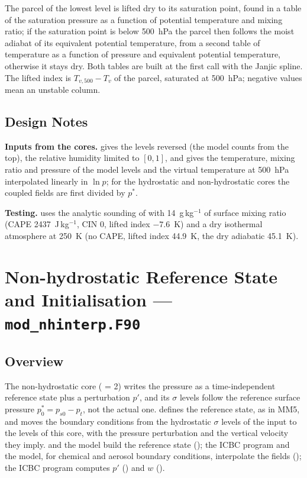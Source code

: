 The parcel of the lowest level is lifted dry to its saturation point, found
in a table of the saturation pressure as a function of potential
temperature and mixing ratio; if the saturation point is below 500~hPa the
parcel then follows the moist adiabat of its equivalent potential
temperature, from a second table of temperature as a function of pressure
and equivalent potential temperature, otherwise it stays dry. Both tables
are built at the first call with the Janjic spline. The lifted index is
$T_{v,500} - T_v$ of the parcel, saturated at 500~hPa; negative values mean
an unstable column.

\subsection{Design Notes}

\textbf{Inputs from the cores.}  gives
 the levels reversed (the model counts from the top), the
relative humidity limited to $[0,1]$, and gives  the
temperature, mixing ratio and pressure of the model levels and the virtual
temperature at 500~hPa interpolated linearly in $\ln p$; for the
hydrostatic and non-hydrostatic cores the coupled fields are first divided
by $p^*$.

\textbf{Testing.}  uses the analytic
sounding of \citet{weisman1982} with 14~g\,kg$^{-1}$ of surface mixing
ratio (CAPE 2437~J\,kg$^{-1}$, CIN 0, lifted index $-7.6$~K) and a dry
isothermal atmosphere at 250~K (no CAPE, lifted index 44.9~K, the dry
adiabatic 45.1~K).

\section{Non-hydrostatic Reference State and Initialisation ---
         \texttt{mod\_nhinterp.F90}}
\label{sec:nhinterp}

\subsection{Overview}

The non-hydrostatic core ( = 2) writes the pressure as a
time-independent reference state plus a perturbation $p'$, and its $\sigma$
levels follow the reference surface pressure $p^*_0 = p_{s0} - p_t$, not
the actual one.  defines the reference state, as in
MM5, and moves the boundary conditions from the hydrostatic $\sigma$ levels
of the input to the levels of this core, with the pressure perturbation
and the vertical velocity they imply.  and the model build
the reference state (); the ICBC program and the model, for
chemical and aerosol boundary conditions, interpolate the fields
(); the ICBC program computes $p'$ () and $w$
().

